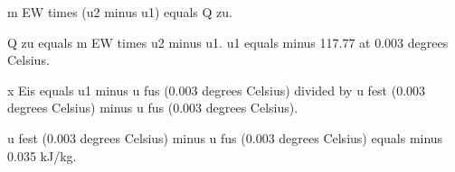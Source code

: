 m EW times (u2 minus u1) equals Q zu.  

Q zu equals m EW times u2 minus u1.  
u1 equals minus 117.77 at 0.003 degrees Celsius.  

x Eis equals u1 minus u fus (0.003 degrees Celsius) divided by u fest (0.003 degrees Celsius) minus u fus (0.003 degrees Celsius).  

u fest (0.003 degrees Celsius) minus u fus (0.003 degrees Celsius) equals minus 0.035 kJ/kg.